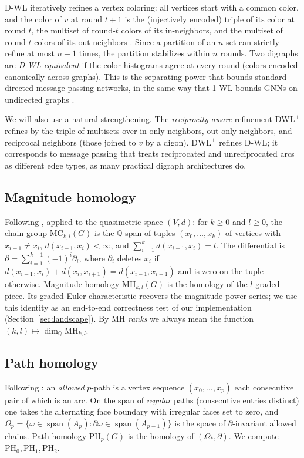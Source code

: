 \documentclass[pdflatex,sn-mathphys,Numbered]{sn-jnl}
\theoremstyle{thmstyleone}
\theoremstyle{thmstyletwo}
\newcommand{\MH}{\mathrm{MH}}
\newcommand{\PH}{\mathrm{PH}}
\newcommand{\MC}{\mathrm{MC}}
\newcommand{\QQ}{\mathbb{Q}}
\newcommand{\dwlp}{\mathrm{DWL}^{+}}
\begin{document}
D-WL iteratively refines a vertex coloring: all vertices start with a
common color, and the color of $v$ at round $t{+}1$ is the (injectively
encoded) triple of its color at round $t$, the multiset of round-$t$
colors of its in-neighbors, and the multiset of round-$t$ colors of its
out-neighbors \cite{GroheColRef,Jaume19}. Since a partition of an $n$-set
can strictly refine at most $n-1$ times, the partition stabilizes within
$n$ rounds. Two digraphs are \emph{D-WL-equivalent} if the color
histograms agree at every round (colors encoded canonically across
graphs). This is the separating power that bounds standard directed
message-passing networks, in the same way that 1-WL bounds GNNs on
undirected graphs \cite{Xu19,Morris19}.

We will also use a natural strengthening. The \emph{reciprocity-aware}
refinement $\dwlp$ refines by the triple of multisets over in-only
neighbors, out-only neighbors, and reciprocal neighbors (those joined to
$v$ by a digon). $\dwlp$ refines D-WL; it corresponds to message passing
that treats reciprocated and unreciprocated arcs as different edge types,
as many practical digraph architectures do.

\subsection{Magnitude homology}

Following \cite{HepworthWillerton17,LeinsterShulman21}, applied to the
quasimetric space $(V, d)$: for $k \ge 0$ and $l \ge 0$, the chain group
$\MC_{k,l}(G)$ is the $\QQ$-span of tuples $(x_0, \dots, x_k)$ of
vertices with $x_{i-1} \ne x_i$, $d(x_{i-1}, x_i) < \infty$, and
$\sum_{i=1}^{k} d(x_{i-1}, x_i) = l$. The differential is
$\partial = \sum_{i=1}^{k-1} (-1)^i \partial_i$, where $\partial_i$
deletes $x_i$ if $d(x_{i-1},x_i) + d(x_i,x_{i+1}) = d(x_{i-1},x_{i+1})$
and is zero on the tuple otherwise. Magnitude homology $\MH_{k,l}(G)$ is
the homology of the $l$-graded piece. Its graded Euler characteristic
recovers the magnitude power series; we use this identity as an
end-to-end correctness test of our implementation
(Section~\ref{sec:landscape}). By $\MH$ \emph{ranks} we always mean the
function $(k,l) \mapsto \dim_\QQ \MH_{k,l}$.

\subsection{Path homology}

Following \cite{GLMY12,GLMY14}: an \emph{allowed} $p$-path is a vertex
sequence $(x_0,\dots,x_p)$ each consecutive pair of which is an arc. On
the span of \emph{regular} paths (consecutive entries distinct) one takes
the alternating face boundary with irregular faces set to zero, and
$\Omega_p = \{\omega \in \operatorname{span}(A_p) : \partial\omega \in
\operatorname{span}(A_{p-1})\}$ is the space of $\partial$-invariant
allowed chains. Path homology $\PH_p(G)$ is the homology of
$(\Omega_\ast, \partial)$. We compute $\PH_0, \PH_1, \PH_2$.
\end{document}
